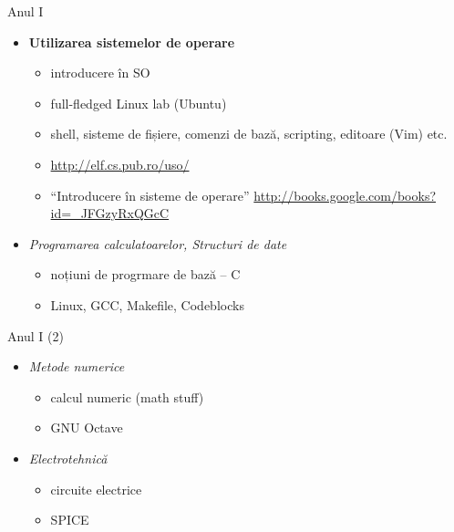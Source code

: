 \documentclass{simple}
\begin{document}

\begin{frame}{Anul I}
	\begin{itemize}
		\item \textbf{Utilizarea sistemelor de operare}
			\begin{itemize}
				\item introducere în SO
				\item full-fledged Linux lab (Ubuntu)
				\item shell, sisteme de fișiere, comenzi de bază, scripting,
				editoare (Vim) etc.
				\item \url{http://elf.cs.pub.ro/uso/}
				\item ``Introducere în sisteme de operare''
				\url{http://books.google.com/books?id=_JFGzyRxQGcC}
			\end{itemize}
		\item \textit{Programarea calculatoarelor, Structuri de date}
			\begin{itemize}
				\item noțiuni de progrmare de bază -- C
				\item Linux, GCC, Makefile, Codeblocks
			\end{itemize}
	\end{itemize}
\end{frame}

\begin{frame}{Anul I (2)}
	\begin{itemize}
		\item \textit{Metode numerice}
			\begin{itemize}
				\item calcul numeric (math stuff)
				\item GNU Octave
			\end{itemize}
		\item \textit{Electrotehnică}
			\begin{itemize}
				\item circuite electrice
				\item SPICE
			\end{itemize}
	\end{itemize}
\end{frame}
\end{document}

